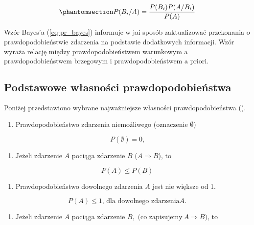\documentclass[
  letterpaper,
  DIV=11,
  numbers=noendperiod]{scrreprt}
\providecommand{\tightlist}{%
  \setlength{\itemsep}{0pt}\setlength{\parskip}{0pt}}\usepackage{longtable,booktabs,array}
\begin{document}
\begin{equation}\phantomsection\label{eq-pr_bayes}{ P(B_i/A)= \frac{P(B_i)P(A / B_i)}{P(A)}}\end{equation}

Wzór Bayes'a (\ref{eq-pr_bayes}) informuje w jai sposób zaktualizować
przekonania o prawdopodobieństwie zdarzenia na podstawie dodatkowych
informacji. Wzór wyraża relację między prawdopodobieństwem warunkowym a
prawdopodobieństwem brzegowym i prawdopodobieństwem a priori.

\subsection{Podstawowe własności
prawdopodobieństwa}\label{podstawowe-wux142asnoux15bci-prawdopodobieux144stwa}

Poniżej przedstawiono wybrane najważniejsze własności prawdopodobieństwa
().

\begin{enumerate}
\def\labelenumi{\arabic{enumi}.}
\tightlist
\item
  Prawdopodobieństwo zdarzenia niemożliwego (oznaczenie \(\emptyset\))
\end{enumerate}

\[ P(\emptyset) = 0 \text{,}\]

\begin{enumerate}
\def\labelenumi{\arabic{enumi}.}
\setcounter{enumi}{1}
\tightlist
\item
  Jeżeli zdarzenie \(A\) pociąga zdarzenie \(B\) (\(A \Rightarrow B\)),
  to
\end{enumerate}

\[ P(A) \le P(B) \]

\begin{enumerate}
\def\labelenumi{\arabic{enumi}.}
\setcounter{enumi}{2}
\tightlist
\item
  Prawdopodobieństwo dowolnego zdarzenia \(A\) jest nie większe od 1.
\end{enumerate}

\[ P(A) \le 1 \text{, dla dowolnego zdarzenia} A.\]

\begin{enumerate}
\def\labelenumi{\arabic{enumi}.}
\setcounter{enumi}{3}
\tightlist
\item
  Jeżeli zdarzenie \(A\) pociąga zdarzenie
  \(B, \text{ (co zapisujemy} \  A \Rightarrow B)\), to
\end{enumerate}
\end{document}
